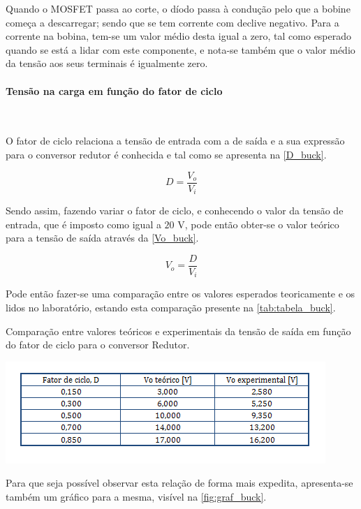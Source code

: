 \documentclass[a4paper,11pt]{article}
\numberwithin{equation}{section}
\begin{document}
Quando o MOSFET passa ao corte, o díodo passa à condução pelo que a bobine começa a descarregar; sendo que se tem corrente com declive negativo. Para a corrente na bobina, tem-se um valor médio desta igual a zero, tal como esperado quando se está a lidar com este componente, e nota-se também que o valor médio da tensão aos seus terminais é igualmente zero.

\paragraph{Tensão na carga em função do fator de ciclo}\mbox{}\

O fator de ciclo relaciona a tensão de entrada com a de saída e a sua expressão para o conversor redutor é conhecida e tal como se apresenta na \autoref{D_buck}.

\begin{equation}
	D= \frac{V_o}{V_i} \label{D_buck}
\end{equation}

Sendo assim, fazendo variar o fator de ciclo, e conhecendo o valor da tensão de entrada, que é imposto como igual a $20$ V, pode então obter-se o valor teórico para a tensão de saída através da \autoref{Vo_buck}.

\begin{equation}
V_o= \frac{D}{V_i} \label{Vo_buck}
\end{equation}

Pode então fazer-se uma comparação entre os valores esperados teoricamente e os lidos no laboratório, estando esta comparação presente na \autoref{tab:tabela_buck}.

\begin{table}[!htb]
	\centering
	\caption{Comparação entre valores teóricos e experimentais da tensão de saída em função do fator de ciclo para o conversor Redutor.}
	\includegraphics[width=0.8\linewidth]{teoricas/tabela_buck}
	\label{tab:tabela_buck}
\end{table}

Para que seja possível observar esta relação de forma mais expedita, apresenta-se também um gráfico para a mesma, visível na \autoref{fig:graf_buck}.
\end{document}
